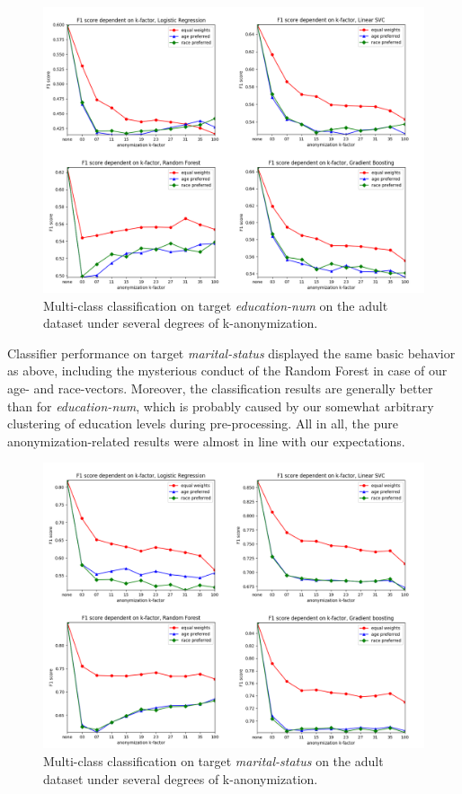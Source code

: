 \documentclass{llncs}
\begin{document}
\begin{figure}[!h]
	\centering
	\includegraphics[width=1\textwidth]{figures/anonymization/adults_education_num/anon_education_combined}
	\caption{Multi-class classification on target \textit{education-num} on the adult dataset under several degrees of k-anonymization.}
	\label{fig:results_anonymization_education_num}
\end{figure}

Classifier performance on target \textit{marital-status} displayed the same basic behavior as above, including the mysterious conduct of the Random Forest in case of our age- and race-vectors. Moreover, the classification results are generally better than for \textit{education-num}, which is probably caused by our somewhat arbitrary clustering of education levels during pre-processing. All in all, the pure anonymization-related results were almost in line with our expectations.


\begin{figure}[!h]
	\centering
	\includegraphics[width=1\textwidth]{figures/anonymization/adults_marital_status/anon_marital_combined}
	\caption{Multi-class classification on target \textit{marital-status} on the adult dataset under several degrees of k-anonymization.}
	\label{fig:results_anonymization_marital_status}
\end{figure}
\end{document}
